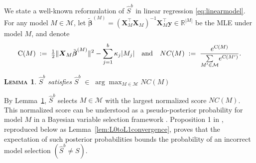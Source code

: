 \documentclass[bj,authoryear]{imsart}
\theoremstyle{plain}
\newtheorem{lem}[thm]{\textsc{Lemma}}
\newcommand{\R}{\mathbb{R}}
\newcommand{\M}{\mathcal{M}}
\newcommand{\bs}{\boldsymbol}
\begin{document}
We state a well-known
reformulation of $\hat S^b$ in linear regression \eqref{eq:linearmodel}. For any model $M\in \M$, let $\tilde{\bs \beta}^{(M)}= (\bs X_{\!\!M}^\top \bs X_{\!\!M})^{-1}\bs X_{\!\!M}^\top\bs y \in \R^{|M|}$ be the MLE under model $M$, and denote
\begin{equation}\label{eq:CM}
    {\rm C}(M)\;: =\;\tfrac{1}{2}\|\bs X_M\tilde{\bs\beta}^{(M)}\|^2-\sum_{j=1}^b\kappa_j |M_j|\quad\text{and}\quad NC(M)\;:=\;\frac{e^{{\rm C}(M)}}{\underset{M' \in \M}{\sum} e^{{\rm C}(M')}}.
\end{equation}
\begin{lem}\label{lem:useful-reformulation} $\hat S^b$ satisfies $\hat S^b\;\in\;\arg\max_{M\in \M} NC(M)$
\end{lem}
By Lemma~\ref{lem:useful-reformulation}, $\hat S^b$ selects
$M\in \M$ with the largest normalized score $NC(M)$. This normalized score can be understood as a pseudo-posterior probability for model $M$ in a Bayesian variable selection framework \citep{BIC}.
Proposition 1 in \cite{rossell2022concentration}, reproduced below as Lemma~\ref{lem:L0toL1convergence}, proves that the expectation of such posterior probabilities bounds the probability of an incorrect model selection $(\hat S^b\neq S)$. 
\end{document}
